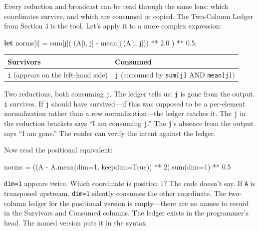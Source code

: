\documentclass[11pt,titlepage]{article}
\newenvironment{Shaded}{}{}
\newcommand{\BuiltInTok}[1]{#1}
\newcommand{\DecValTok}[1]{\textcolor[rgb]{0.25,0.63,0.44}{#1}}
\newcommand{\FloatTok}[1]{\textcolor[rgb]{0.25,0.63,0.44}{#1}}
\newcommand{\KeywordTok}[1]{\textcolor[rgb]{0.00,0.44,0.13}{\textbf{#1}}}
\newcommand{\NormalTok}[1]{#1}
\newcommand{\OperatorTok}[1]{\textcolor[rgb]{0.40,0.40,0.40}{#1}}
\newcommand{\VariableTok}[1]{\textcolor[rgb]{0.10,0.09,0.49}{#1}}
\begin{document}
Every reduction and broadcast can be read through the same lens: which
coordinates survive, and which are consumed or copied. The Two-Column
Ledger from Section 4 is the tool. Let's apply it to a more complex
expression:

\begin{Shaded}
\begin{Highlighting}[]
\KeywordTok{let}\NormalTok{ norms}\OperatorTok{[}\NormalTok{i}\OperatorTok{]}\NormalTok{ = sum}\OperatorTok{[}\NormalTok{j}\OperatorTok{]}\NormalTok{( (A}\OperatorTok{[}\NormalTok{i, j}\OperatorTok{]}\NormalTok{ - mean}\OperatorTok{[}\NormalTok{j}\OperatorTok{]}\NormalTok{(A}\OperatorTok{[}\NormalTok{i, j}\OperatorTok{]}\NormalTok{)) ** }\DecValTok{2.0}\NormalTok{ ) ** }\DecValTok{0.5}\NormalTok{;}
\end{Highlighting}
\end{Shaded}

\begin{longtable}[]{@{}ll@{}}
\toprule
Survivors & Consumed\tabularnewline
\midrule
\endhead
\texttt{i} (appears on the left-hand side) & \texttt{j} (consumed by
\texttt{sum{[}j{]}} AND \texttt{mean{[}j{]}})\tabularnewline
\bottomrule
\end{longtable}

Two reductions, both consuming \texttt{j}. The ledger tells us:
\texttt{j} is gone from the output. \texttt{i} survives. If \texttt{j}
should have survived---if this was supposed to be a per-element
normalization rather than a row normalization---the ledger catches it.
The \texttt{j} in the reduction brackets says ``I am consuming
\texttt{j}.'' The \texttt{j}'s absence from the output says ``I am
gone.'' The reader can verify the intent against the ledger.

Now read the positional equivalent:

\begin{Shaded}
\begin{Highlighting}[]
\NormalTok{norms }\OperatorTok{=}\NormalTok{ ((A }\OperatorTok{-}\NormalTok{ A.mean(dim}\OperatorTok{=}\DecValTok{1}\NormalTok{, keepdim}\OperatorTok{=}\VariableTok{True}\NormalTok{)) }\OperatorTok{**} \DecValTok{2}\NormalTok{).}\BuiltInTok{sum}\NormalTok{(dim}\OperatorTok{=}\DecValTok{1}\NormalTok{) }\OperatorTok{**} \FloatTok{0.5}
\end{Highlighting}
\end{Shaded}

\texttt{dim=1} appears twice. Which coordinate is position 1? The code
doesn't say. If \texttt{A} is transposed upstream, \texttt{dim=1}
silently consumes the other coordinate. The two-column ledger for the
positional version is empty---there are no names to record in the
Survivors and Consumed columns. The ledger exists in the programmer's
head. The named version puts it in the syntax.
\end{document}
